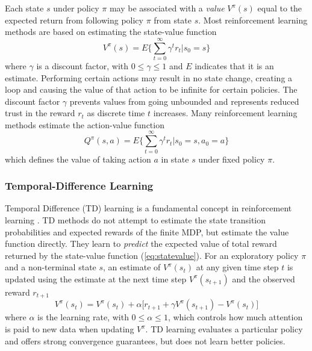 Each state $s$ under policy $\pi$ may be associated with a \textit{value}
$V^\pi(s)$ equal to the expected return from following policy $\pi$ from state
$s$.  Most reinforcement learning methods are based on estimating the
state-value function
\begin{equation}
\label{eq:statevalue}
V^\pi(s) = E \Bigg\lbrace \sum^\infty_{t=0} \gamma^t r_t \Bigg\vert s_0 = s
\Bigg\rbrace
\end{equation}
where $\gamma$ is a discount factor, with $0\leq \gamma \leq 1$ and $E$
indicates that it is an estimate. Performing certain actions may result in no
state change, creating a loop and causing the value of that action to be infinite for certain policies.
The discount factor $\gamma$ prevents values from going unbounded and
represents reduced trust in the reward $r_t$ as discrete time $t$
increases.  Many reinforcement learning methods estimate the action-value
function
\begin{equation}
\label{eq:actionvalue}
Q^\pi(s,a) = E \Bigg\lbrace \sum^\infty_{t=0} \gamma^t r_t \Bigg\vert s_0 = s,
a_0 = a \Bigg\rbrace
\end{equation}
which defines the value of taking action $a$ in state $s$ under fixed policy
$\pi$.

\subsubsection{Temporal-Difference Learning}
Temporal Difference (TD) learning is a fundamental concept in reinforcement
learning \cite{suttonbarto:1998}. TD methods do not attempt to estimate the
state transition probabilities and expected rewards of the finite MDP, but estimate the value function directly.
They learn to \textit{predict} the expected value of total reward returned by
the state-value function (\ref{eq:statevalue}).  For an exploratory policy $\pi$
and a non-terminal state $s$, an estimate of $V^\pi(s_t)$ at any given time step
$t$ is updated using the estimate at the next time step $V^\pi(s_{t+1})$ and the
observed reward $r_{t+1}$
\begin{equation}
V^\pi(s_t) = V^\pi(s_t) + \alpha \bigl[r_{t+1} + \gamma
V^\pi(s_{t+1}) - V^\pi(s_t) \bigr]
\end{equation}
where $\alpha$ is the learning rate, with $0 \leq \alpha \leq 1$, which controls
how much attention is paid to new data when updating $V^\pi$.  TD learning
evaluates a particular policy and offers strong convergence guarantees, but does
not learn better policies.

